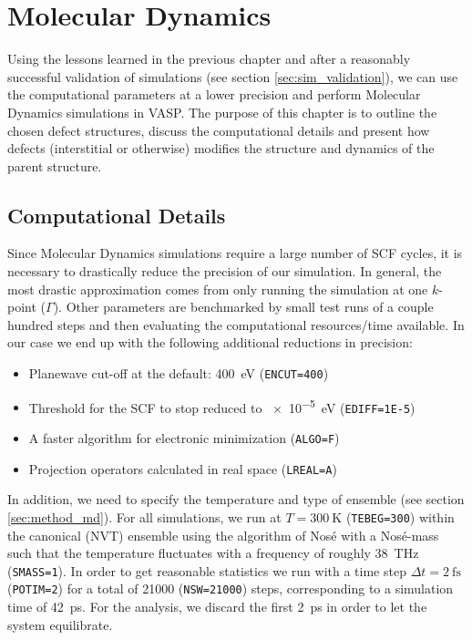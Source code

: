 \chapter{Molecular Dynamics}\label{ch:md}

Using the lessons learned in the previous chapter and after a reasonably successful validation of simulations (see section \ref{sec:sim_validation}), we can use the computational parameters at a lower precision and perform Molecular Dynamics simulations in VASP. The purpose of this chapter is to outline the chosen defect structures, discuss the computational details and present how defects (interstitial or otherwise) modifies the structure and dynamics of the parent structure.

\section{Computational Details}
Since Molecular Dynamics simulations require a large number of SCF cycles, it is necessary to drastically reduce the precision of our simulation. In general, the most drastic approximation comes from only running the simulation at one $k$-point ($\Gamma$). Other parameters are benchmarked by small test runs of a couple hundred steps and then evaluating the computational resources/time available. In our case we end up with the following additional reductions in precision:

\begin{itemize}
	\item Planewave cut-off at the default: \SI{400}{\eV} (\texttt{ENCUT=400})
	\item Threshold for the SCF to stop reduced to \SI{e-5}{\eV} (\texttt{EDIFF=1E-5})
	\item A faster algorithm for electronic minimization (\texttt{ALGO=F})
	\item Projection operators calculated in real space (\texttt{LREAL=A})
\end{itemize}

In addition, we need to specify the temperature and type of ensemble (see section \ref{sec:method_md}). For all simulations, we run at $T=\SI{300}{\kelvin}$ (\texttt{TEBEG=300}) within the canonical (NVT) ensemble using the algorithm of Nos\'{e} with a Nos\'{e}-mass such that the temperature fluctuates with a frequency of roughly \SI{38}{\tera\hertz} (\texttt{SMASS=1}). In order to get reasonable statistics we run with a time step $\Delta t = \SI{2}{\femto\second}$ (\texttt{POTIM=2}) for a total of 21000 (\texttt{NSW=21000}) steps, corresponding to a simulation time of \SI{42}{\pico\second}. For the analysis, we discard the first \SI{2}{\pico\second} in order to let the system equilibrate.

